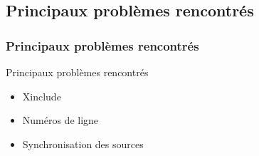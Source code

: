 \subsection{Principaux problèmes rencontrés}
\begin{frame}\frametitle{Principaux problèmes rencontrés}
\begin{beamerboxesrounded}[shadow=true]{Principaux problèmes rencontrés}
\begin{itemize}
	\item Xinclude
	\item Numéros de ligne
	\item Synchronisation des sources
\end{itemize}
\end{beamerboxesrounded}
\end{frame}
